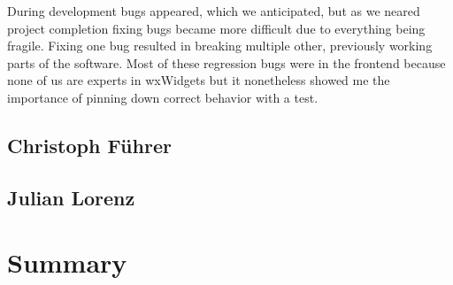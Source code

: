 During development bugs appeared, which we anticipated, but as we neared
project completion fixing bugs became more difficult due to everything being
fragile. Fixing one bug resulted in breaking multiple other, previously working
parts of the software. Most of these regression bugs were in the frontend
because none of us are experts in wxWidgets but it nonetheless showed me the
importance of pinning down correct behavior with a test.

\subsection{Christoph Führer}
\subsection{Julian Lorenz}

\section{Summary}
